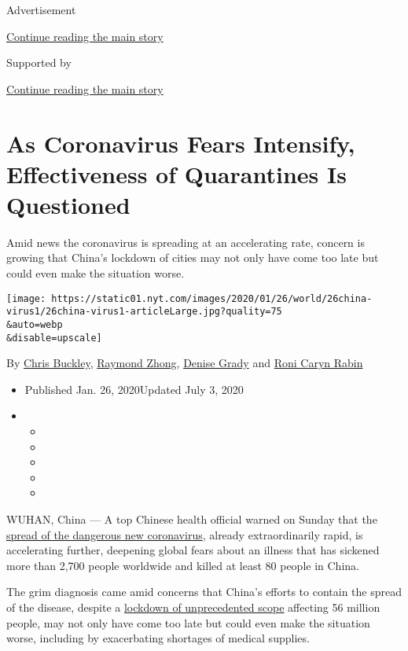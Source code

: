 Advertisement

\protect\hyperlink{after-top}{Continue reading the main story}

Supported by

\protect\hyperlink{after-sponsor}{Continue reading the main story}

\hypertarget{as-coronavirus-fears-intensify-effectiveness-of-quarantines-is-questioned}{%
\section{As Coronavirus Fears Intensify, Effectiveness of Quarantines Is
Questioned}\label{as-coronavirus-fears-intensify-effectiveness-of-quarantines-is-questioned}}

Amid news the coronavirus is spreading at an accelerating rate, concern
is growing that China's lockdown of cities may not only have come too
late but could even make the situation worse.

\texttt{[image: https://static01.nyt.com/images/2020/01/26/world/26china-virus1/26china-virus1-articleLarge.jpg?quality=75\\\&auto=webp\\\&disable=upscale]}

By \href{https://www.nytimes.com/by/chris-buckley}{Chris Buckley},
\href{https://www.nytimes.com/by/raymond-zhong}{Raymond Zhong},
\href{https://www.nytimes.com/by/denise-grady}{Denise Grady} and
\href{https://www.nytimes.com/by/roni-caryn-rabin}{Roni Caryn Rabin}

\begin{itemize}
\item
  Published Jan. 26, 2020Updated July 3, 2020
\item
  \begin{itemize}
  \item
  \item
  \item
  \item
  \item
  \end{itemize}
\end{itemize}

WUHAN, China --- A top Chinese health official warned on Sunday that the
\href{https://www.nytimes.com/2020/01/27/world/asia/china-coronavirus.html}{spread
of the dangerous new coronavirus}, already extraordinarily rapid, is
accelerating further, deepening global fears about an illness that has
sickened more than 2,700 people worldwide and killed at least 80 people
in China.

The grim diagnosis came amid concerns that China's efforts to contain
the spread of the disease, despite a
\href{https://www.nytimes.com/2020/01/23/world/asia/china-coronavirus-outbreak.html}{lockdown
of unprecedented scope} affecting 56 million people, may not only have
come too late but could even make the situation worse, including by
exacerbating shortages of medical supplies.

